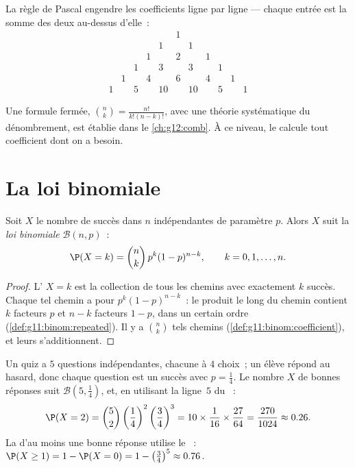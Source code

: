 La règle de Pascal engendre les coefficients ligne par ligne --- chaque
entrée est la somme des deux au-dessus d'elle~:
\[
\begin{array}{ccccccccccc}
&&&&&1&&&&&\\
&&&&1&&1&&&&\\
&&&1&&2&&1&&&\\
&&1&&3&&3&&1&&\\
&1&&4&&6&&4&&1&\\
1&&5&&10&&10&&5&&1
\end{array}
\]

\begin{remark}
Une formule fermée, $\binom nk = \frac{n!}{k!(n-k)!}$, avec une théorie
systématique du dénombrement, est établie dans le \cref{ch:g12:comb}. À
ce niveau, le  calcule tout coefficient dont on a
besoin.
\end{remark}

\section{La loi binomiale}

\begin{theorem}\label{thm:g11:binom:binomial}
Soit $X$ le nombre de succès dans $n$ 
indépendantes de paramètre $p$. Alors $X$ suit la \emph{loi
binomiale} $\mathcal B(n, p)$~:
\[
\P(X = k) = \binom{n}{k}\, p^k (1-p)^{n-k},
\qquad k = 0, 1, \dots, n .
\]
\end{theorem}

\begin{proof}
L' $X = k$ est la collection de tous les chemins avec
exactement $k$ succès. Chaque tel chemin a pour 
$p^k(1-p)^{n-k}$~: le produit le long du chemin contient $k$ facteurs
$p$ et $n - k$ facteurs $1-p$, dans un certain ordre
(\cref{def:g11:binom:repeated}). Il y a $\binom nk$ tels chemins
(\cref{def:g11:binom:coefficient}), et leurs  s'additionnent.
\end{proof}

\begin{example}\label{ex:g11:binom:quiz}
Un quiz a $5$ questions indépendantes, chacune à $4$ choix~; un élève
répond au hasard, donc chaque question est un succès avec
$p = \frac14$. Le nombre $X$ de bonnes réponses suit
$\mathcal B\left(5, \frac14\right)$, et, en utilisant la ligne~$5$ du
~:
\[
\P(X = 2) = \binom52 \left(\frac14\right)^2\left(\frac34\right)^3
= 10 \times \frac{1}{16} \times \frac{27}{64}
= \frac{270}{1024} \approx 0.26 .
\]
La  d'au moins une bonne réponse utilise le ~:
$\P(X \geq 1) = 1 - \P(X = 0) = 1 - \left(\frac34\right)^5 \approx
0.76$.
\end{example}

